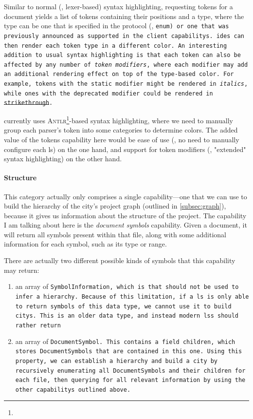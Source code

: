 \documentclass[../thesis]{subfiles}
\begin{document}
\begin{itemize}
        Similar to normal (\eg, lexer-based) syntax highlighting, requesting \glspl{token} for a document yields a list of tokens containing their positions and a type, where the type can be one that is specified in the protocol (\eg, \tt{enum}) or one that was previously announced as supported in the client \glspl{capability}.
    \glspl{ide} can then render each token type in a different color.
    An interesting addition to usual syntax highlighting is that each token can also be affected by any number of \emph{token modifiers}, where each modifier may add an additional rendering effect on top of the type-based color.
    For example, tokens with the \tt{static} modifier might be rendered in \textit{italics}, while ones with the \tt{deprecated} modifier could be rendered in \st{strikethrough}.

    \SEE{} currently uses \textsc{Antlr}\footnote{}-based syntax highlighting, where we need to manually group each parser's token into some categories to determine colors.
    The added value of the \glspl{token} \gls{capability} here would be ease of use (\ie, no need to manually configure each \gls{ls}) on the one hand, and support for token modifiers (\ie, "extended" syntax highlighting) on the other hand.
\end{itemize}


\paragraph{Structure}
This category actually only comprises a single \gls{capability}---one that we can use to build the hierarchy of the \gls{city}'s project graph (outlined in \cref{subsec:graph}), because it gives us information about the structure of the project.
The \gls{capability} I am talking about here is the \emph{document symbols} \gls{capability}.
Given a document, it will return all symbols present within that file, along with some additional information for each symbol, such as its type or \gls{range}.

There are actually two different possible kinds of symbols that this \gls{capability} may return:
\begin{enumerate}
	\item an array of \tt{SymbolInformation}, which is  that should not be used to infer a hierarchy.
	      Because of this limitation, if a \gls{ls} is only able to return symbols of this data type, we cannot use it to build \glspl{city}.
	      This is an older data type, and instead modern \glspl{ls} should rather return
	\item an array of \tt{DocumentSymbol}.
	      This contains a field \tt{children}, which stores \tt{DocumentSymbol}s that are contained in this one.
	      Using this property, we can establish a hierarchy and build a \gls{city} by recursively enumerating all \tt{DocumentSymbol}s and their children for each file, then querying for all relevant information by using the other \glspl{capability} outlined above.
\end{enumerate}
\end{document}

